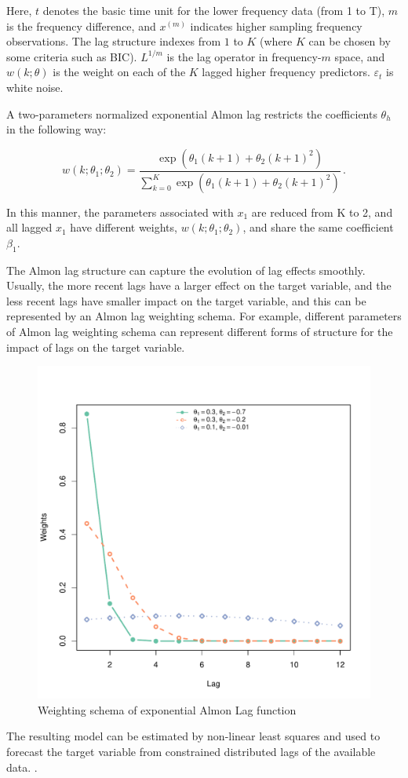 Here, $t$ denotes the basic time unit for the lower frequency data (from 1 to T), $m$ is the frequency difference, and $x^{(m)}$ indicates higher sampling frequency observations. The lag structure indexes from $1$ to $K$ (where $K$ can be chosen by some criteria such as BIC).  $L^{1/m}$ is the lag operator in frequency-$m$ space, and $w(k;\theta)$ is the weight on each of the $K$ lagged higher frequency predictors. $\varepsilon_t$ is white noise. 

A two-parameters normalized exponential Almon lag restricts the coefficients $\theta_h$ in the following way:

$${w(k; \theta_1;\theta_2)=\frac{\exp(\theta_1(k+1)+\theta_2(k+1)^2)}{\sum_{k=0}^K\exp(\theta_1(k+1)+\theta_2 (k+1)^2)}} \, .$$

In this manner, the parameters associated with $x_1$ are reduced from K to 2, and all lagged $x_1$ have different weights, $w(k; \theta_1;\theta_2)$, and share the same coefficient $\beta_1$. 

The Almon lag structure can capture the evolution of lag effects  smoothly. Usually, the more recent lags have a larger effect on the target variable, and the less recent lags have smaller impact on the target variable, and this can be represented by an Almon lag weighting schema. For example, different parameters of  Almon lag weighting schema can represent different forms of structure for the impact of lags on the target variable. 


\begin{figure}[h]
\centering
\includegraphics[width=0.5\linewidth]{Figures/weight}
\caption{Weighting schema of exponential Almon Lag function}
\label{fig:weight}
\end{figure}





The resulting model can be estimated by non-linear least squares and used to forecast the target variable from constrained distributed lags of the available data. \cite{Guerin2013}. 



